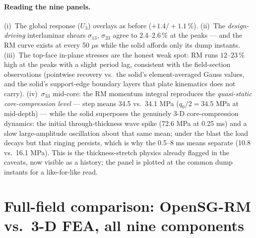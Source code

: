 \documentclass[11pt]{article}
\begin{document}
\paragraph{Reading the nine panels.}
(i)~The global response ($U_3$) overlays as before ($+1.4/{+}1.1\,\%$).
(ii)~The \emph{design-driving} interlaminar shears $\sigma_{13}$,
$\sigma_{23}$ agree to $2.4$--$2.6\,\%$ at the peaks --- and the RM curve
exists at every 50 $\mu$s while the solid affords only its dump instants.
(iii)~The top-face in-plane stresses are the honest weak spot: RM runs
$12$--$23\,\%$ high at the peaks with a slight period lag, consistent
with the field-section observations (pointwise recovery vs.\ the solid's
element-averaged Gauss values, and the solid's support-edge boundary
layers that plate kinematics does not carry).  (iv)~$\sigma_{33}$
mid-core: the RM momentum integral reproduces the \emph{quasi-static
core-compression level} --- step means 34.5 vs.\ 34.1 MPa
($q_0/2=34.5$ MPa at mid-depth) --- while the solid superposes the
genuinely 3-D core-compression dynamics: the initial through-thickness
wave spike (72.6 MPa at 0.25 ms) and a slow large-amplitude oscillation
about that same mean; under the blast the load decays but that ringing
persists, which is why the 0.5--8 ms means separate (10.8 vs.\
16.1 MPa).  This is the thickness-stretch physics already flagged in the
caveats, now visible as a history; the panel is plotted at the common
dump instants for a like-for-like read.

\section{Full-field comparison: OpenSG-RM vs.\ 3-D FEA, all nine
components}
\label{sec:field}
\end{document}
